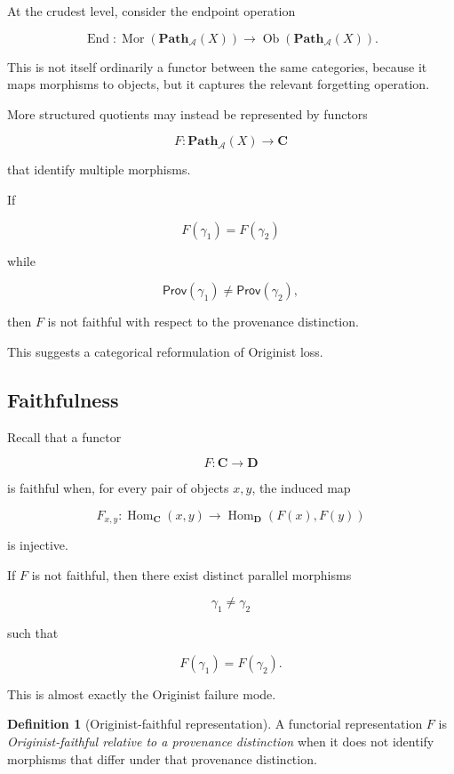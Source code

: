 \documentclass[
  11pt,
  a4paper,
  DIV=12,
  BCOR=0mm,
  parskip=half-
]{scrartcl}
\newcommand{\End}{\operatorname{End}}
\newcommand{\Hom}{\operatorname{Hom}}
\newcommand{\Mor}{\operatorname{Mor}}
\newcommand{\Ob}{\operatorname{Ob}}
\theoremstyle{definition}
\newtheorem{definition}{Definition}[section]
\theoremstyle{plain}
\theoremstyle{remark}
\begin{document}
At the crudest level, consider the endpoint operation

\[
  \End:
  \Mor(\mathbf{Path}_{\mathcal A}(X))
  \to
  \Ob(\mathbf{Path}_{\mathcal A}(X)).
\]

This is not itself ordinarily a functor between the same categories, because
it maps morphisms to objects, but it captures the relevant forgetting
operation.

More structured quotients may instead be represented by functors

\[
  F:
  \mathbf{Path}_{\mathcal A}(X)
  \to
  \mathbf C
\]

that identify multiple morphisms.

If

\[
  F(\gamma_1)=F(\gamma_2)
\]

while

\[
  \mathsf{Prov}(\gamma_1)
  \neq
  \mathsf{Prov}(\gamma_2),
\]

then \(F\) is not faithful with respect to the provenance distinction.

This suggests a categorical reformulation of Originist loss.


\subsection{Faithfulness}
\label{app:faithfulness}

Recall that a functor

\[
  F:\mathbf C\to\mathbf D
\]

is faithful when, for every pair of objects \(x,y\), the induced map

\[
  F_{x,y}:
  \Hom_{\mathbf C}(x,y)
  \to
  \Hom_{\mathbf D}(F(x),F(y))
\]

is injective.

If \(F\) is not faithful, then there exist distinct parallel morphisms

\[
  \gamma_1\neq\gamma_2
\]

such that

\[
  F(\gamma_1)=F(\gamma_2).
\]

This is almost exactly the Originist failure mode.

\begin{definition}[Originist-faithful representation]
\label{def:originist-faithful}
A functorial representation \(F\) is \emph{Originist-faithful relative to a
provenance distinction} when it does not identify morphisms that differ under
that provenance distinction.
\end{definition}
\end{document}
